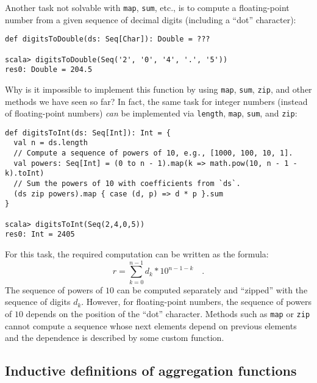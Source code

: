 Another task not solvable with \lstinline!map!, \lstinline!sum!,
etc., is to compute a floating-point number from a given sequence
of decimal digits (including a \textsf{``}dot\textsf{''} character):
\begin{lstlisting}
def digitsToDouble(ds: Seq[Char]): Double = ???

scala> digitsToDouble(Seq('2', '0', '4', '.', '5'))
res0: Double = 204.5
\end{lstlisting}
Why is it impossible to implement this function by using \lstinline!map!,
\lstinline!sum!, \lstinline!zip!, and other methods we have seen
so far? In fact, the same task for integer numbers (instead of floating-point
numbers) \emph{can} be implemented via \lstinline!length!, \lstinline!map!,
\lstinline!sum!, and \lstinline!zip!:
\begin{lstlisting}
def digitsToInt(ds: Seq[Int]): Int = {
  val n = ds.length
  // Compute a sequence of powers of 10, e.g., [1000, 100, 10, 1].
  val powers: Seq[Int] = (0 to n - 1).map(k => math.pow(10, n - 1 - k).toInt)
  // Sum the powers of 10 with coefficients from `ds`.
  (ds zip powers).map { case (d, p) => d * p }.sum                                  
}

scala> digitsToInt(Seq(2,4,0,5))
res0: Int = 2405
\end{lstlisting}
For this task, the required computation can be written as the formula:
\[
r=\sum_{k=0}^{n-1}d_{k}*10^{n-1-k}\quad.
\]
The sequence of powers of $10$ can be computed separately and \textsf{``}zipped\textsf{''}
with the sequence of digits $d_{k}$. However, for floating-point
numbers, the sequence of powers of $10$ depends on the position of
the \textsf{``}dot\textsf{''} character. Methods such as \lstinline!map! or \lstinline!zip!
cannot compute a sequence whose next elements depend on previous elements
and the dependence is described by some custom function.

\subsection{Inductive definitions of aggregation functions\label{subsec:Inductive-definitions-of-aggregation-functions}}

